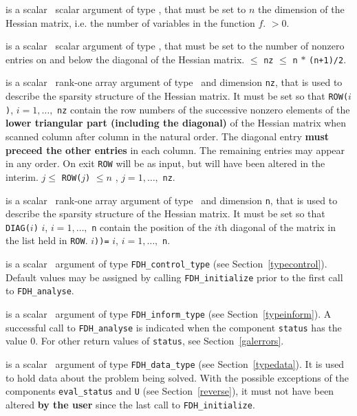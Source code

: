 \documentclass{galahad}
\newcommand{\packagename}{FDH}
\begin{document}
\vspace*{-2mm}
\begin{description}
is a scalar \intentin\ scalar argument of type \integer, that must be 
set to $n$ the dimension of the Hessian matrix, i.e. the number of
variables in the function $f$. 
 $> 0$.

is a scalar \intentin\ scalar argument of type \integer, that must be
set to the number of nonzero entries on and below the diagonal of the Hessian
matrix.
 $\le$ {\tt nz} $\le$ {\tt n} $\ast$ {\tt (n+1)/2}.

 is a scalar \intentinout\ rank-one array argument of type 
\integer\ and dimension {\tt nz}, that is used to describe 
the sparsity structure of the Hessian matrix. It must be set so that
 {\tt ROW(}$i${\tt)}, $i = 1, \ldots,$ {\tt nz} contain the row 
numbers of the successive nonzero elements of the {\bf lower triangular part
(including the diagonal)} of the Hessian matrix when scanned column after
column in the natural order. The diagonal entry 
{\bf must preceed the other entries} in each column. The remaining entries 
may appear in any order. On exit {\tt ROW} will be as input, but will have
been altered in the interim.
\restrictions 
$j \leq$ {\tt ROW(}$j${\tt)} $\leq n$ , $j = 1, \ldots,$ {\tt nz}.

is a scalar \intentin\ rank-one array argument of type 
\integer\ and dimension {\tt n}, that is used to describe 
the sparsity structure of the Hessian matrix. It must be set so that
 {\tt DIAG(}$i${\tt)} $i$, $i = 1, \ldots,$ {\tt n}
contain the position of the $i$th diagonal of the matrix in the list held
in {\tt ROW}.
$i${\tt))=} $i$, $i = 1, \ldots,$ {\tt n}.

 is a scalar \intentin\ argument of type 
{\tt \packagename\_control\_type}
(see Section~\ref{typecontrol}). Default values may be assigned by calling 
{\tt \packagename\_initialize} prior to the first call to 
{\tt \packagename\_analyse}. 

 is a scalar \intentinout\ argument of type 
{\tt \packagename\_inform\_type}
(see Section~\ref{typeinform}). 
A successful call to
{\tt \packagename\_analyse}
is indicated when the  component {\tt status} has the value 0. 
For other return values of {\tt status}, see Section~\ref{galerrors}.

 is a scalar \intentinout\ argument of type 
{\tt \packagename\_data\_type}
(see Section~\ref{typedata}). It is used to hold data about the problem being 
solved. With the possible exceptions of the components 
{\tt eval\_status} and {\tt U} (see Section~\ref{reverse}), 
it must not have been altered {\bf by the user} since the last call to 
{\tt \packagename\_initialize}.

\end{description}
\end{document}
